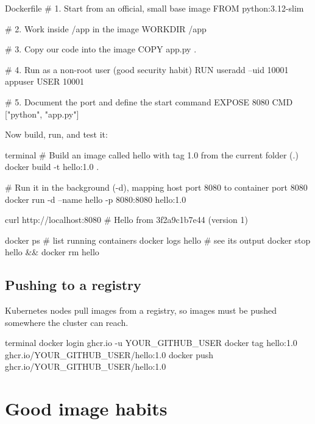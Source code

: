 \begin{dockercode}{Dockerfile}
# 1. Start from an official, small base image
FROM python:3.12-slim

# 2. Work inside /app in the image
WORKDIR /app

# 3. Copy our code into the image
COPY app.py .

# 4. Run as a non-root user (good security habit)
RUN useradd --uid 10001 appuser
USER 10001

# 5. Document the port and define the start command
EXPOSE 8080
CMD ["python", "app.py"]
\end{dockercode}

Now build, run, and test it:

\begin{bashcode}{terminal}
# Build an image called hello with tag 1.0 from the current folder (.)
docker build -t hello:1.0 .

# Run it in the background (-d), mapping host port 8080 to container port 8080
docker run -d --name hello -p 8080:8080 hello:1.0

curl http://localhost:8080
# Hello from 3f2a9c1b7e44 (version 1)

docker ps            # list running containers
docker logs hello    # see its output
docker stop hello && docker rm hello
\end{bashcode}

\subsection{Pushing to a registry}

Kubernetes nodes pull images from a registry, so images must be pushed
somewhere the cluster can reach.

\begin{bashcode}{terminal}
docker login ghcr.io -u YOUR_GITHUB_USER
docker tag hello:1.0 ghcr.io/YOUR_GITHUB_USER/hello:1.0
docker push ghcr.io/YOUR_GITHUB_USER/hello:1.0
\end{bashcode}

\section{Good image habits}

